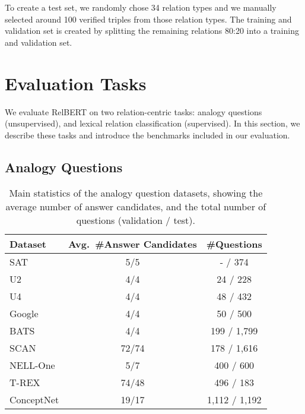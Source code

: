 \documentclass[3p]{elsarticle}
\newcommand{\nb}[1]{\textcolor{red}{$\blacktriangleright$}\footnote{\textcolor{blue}{#1}}}
\begin{document}
{To create a test set, we randomly chose 34 relation types and we manually selected around 100 verified triples from those relation types.
The training and validation set is created by splitting the remaining relations 80:20 into a training and validation set. %

\section{Evaluation Tasks}\label{sec:relbert:evaluation-tasks}
We evaluate RelBERT on two relation-centric tasks: analogy questions (unsupervised), and lexical relation classification (supervised). In this section, we describe these tasks and introduce the benchmarks included in our evaluation.

\subsection{Analogy Questions}\label{analogy-questions}
\begin{table}[t]
\centering
\begin{tabular}{lcc}
\toprule
   Dataset &  Avg.\ {\#}Answer Candidates & {\#}Questions \\
\midrule
       SAT &                        5/5 &               - / 374 \\
        U2 &                        4/4 &              24 / 228 \\
        U4 &                        4/4 &              48 / 432 \\
    Google &                        4/4 &              50 / 500 \\
      BATS &                        4/4 &           199 / 1,799 \\
      SCAN &                      72/74 &           178 / 1,616 \\
  NELL-One &                        5/7 &             400 / 600 \\
     T-REX &                      74/48 &             496 / 183 \\
ConceptNet &                      19/17 &         1,112 / 1,192 \\
\bottomrule
\end{tabular}
\caption{Main statistics of the analogy question datasets, showing the  average number of answer candidates, and the total number of questions (validation / test).}
\label{tab:relbert:analogy-questions-stats}
\end{table}


}
\end{document}
